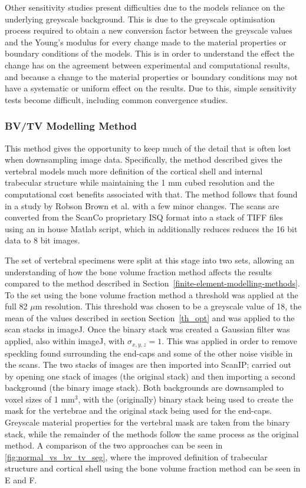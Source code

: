 Other sensitivity studies present difficulties due to the models reliance on
the underlying greyscale background.  This is due to the greyscale optimisation
process required to obtain a new conversion factor between the greyscale values
and the Young's modulus for every change made to the material properties or
boundary conditions of the models.  This is in order to understand the effect
the change has on the agreement between experimental and computational results,
and because a change to the material properties or boundary conditions may not
have a systematic or uniform effect on the results.  Due to this, simple
sensitivity tests become difficult, including common convergence studies.

\subsubsection{BV/TV Modelling Method}\label{bvtv_method}

This method gives the opportunity to keep much of the detail that is often lost
when downsampling image data.  Specifically, the method described gives the
vertebral models much more definition of the cortical shell and internal
trabecular structure while maintaining the 1 mm cubed resolution and the
computational cost benefits associated with that.  The method follows that
found in a study by Robson Brown et al.  \cite{RobsonBrown2014} with a few
minor changes. The scans are converted from the ScanCo proprietary ISQ format
into a stack of TIFF files using an in house Matlab script, which in
additionally reduces reduces the 16 bit data to 8 bit images.

The set of vertebral specimens were split at this stage into two sets, allowing
an understanding of how the bone volume fraction method affects the results
compared to the method described in
Section~\ref{finite-element-modelling-methods}.  To the set using the bone
volume fraction method a threshold was applied at the full 82 $\mu$m
resolution.  This threshold was chosen to be a greyscale value of 18, the mean
of the values described in section Section~\ref{th_opt} and was applied to the
scan stacks in imageJ.  Once the binary stack was created a Gaussian filter was
applied, also within imageJ, with $ \sigma_{x,y,z} = 1 $.  This was applied in
order to remove speckling found surrounding the end-caps and some of the other
noise visible in the scans.  The two stacks of images are then imported into
ScanIP; carried out by opening one stack of images (the original stack) and
then importing a second background (the binary image stack). Both backgrounds
are downsampled to voxel sizes of 1 mm$^3$, with the (originally) binary stack
being used to create the mask for the vertebrae and the original stack being
used for the end-caps.  Greyscale material properties for the vertebral mask
are taken from the binary stack, while the remainder of the methods follow the
same process as the original method.  A comparison of the two approaches can be
seen in \cref{fig:normal_vs_bv_tv_seg}, where the improved definition of
trabecular structure and cortical shell using the bone volume fraction method
can be seen in E and F.

